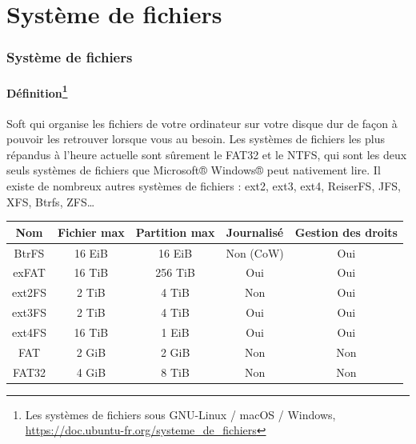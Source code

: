 \documentclass{beamer}
\begin{document}
    \section{Système de fichiers}\label{sec:fs}
    \begin{frame}
        \transdissolve
        \frametitle{Système de fichiers}
        \framesubtitle{Définition\footnote{\label{fs}Les systèmes de fichiers sous GNU-Linux / macOS / Windows, \url{https://doc.ubuntu-fr.org/systeme_de_fichiers}}}
        \begin{footnotesize}
            Soft qui organise les fichiers de votre ordinateur sur votre disque dur de façon
            à pouvoir les retrouver lorsque vous au besoin.
            Les systèmes de fichiers les plus répandus à l'heure actuelle sont sûrement le FAT32 et
            le NTFS, qui sont les deux seuls systèmes de fichiers que Microsoft® Windows® peut nativement lire.
            Il existe de nombreux autres systèmes de fichiers : ext2, ext3, ext4, ReiserFS, JFS, XFS, Btrfs, ZFS\ldots
            \begin{table}[h!]
                \centering
                \begin{tabular}{|c|c|c|c|c|}
                    \hline
                    \textbf{Nom} & \textbf{Fichier max} & \textbf{Partition max} & \textbf{Journalisé} & \textbf{Gestion des droits} \\ \hline
                    BtrFS        & 16 EiB               & 16 EiB                 & Non (CoW)           & Oui                         \\ \hline
                    exFAT        & 16 TiB               & 256 TiB                & Oui                 & Oui                         \\ \hline
                    ext2FS       & 2 TiB                & 4 TiB                  & Non                 & Oui                         \\ \hline
                    ext3FS       & 2 TiB                & 4 TiB                  & Oui                 & Oui                         \\ \hline
                    ext4FS       & 16 TiB               & 1 EiB                  & Oui                 & Oui                         \\ \hline
                    FAT          & 2 GiB                & 2 GiB                  & Non                 & Non                         \\ \hline
                    FAT32        & 4 GiB                & 8 TiB                  & Non                 & Non                         \\ \hline

\end{tabular}
\end{table}
\end{footnotesize}
\end{frame}
\end{document}
